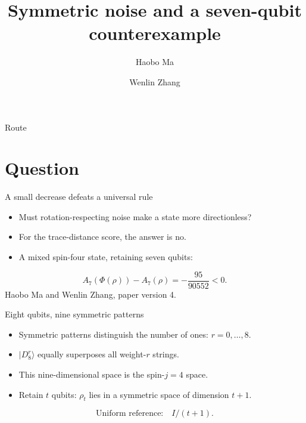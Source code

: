 \documentclass{beamer}
\title{Symmetric noise and a seven-qubit counterexample}
\author{Haobo Ma \and Wenlin Zhang}
\begin{document}
\begin{frame}
\titlepage
{}
\end{frame}
\begin{frame}{Route}
\tableofcontents
{}
\end{frame}
\section{Question}
\begin{frame}{A small decrease defeats a universal rule}
\begin{itemize}
\item Must rotation-respecting noise make a state more directionless?
\item For the trace-distance score, the answer is no.
\item A mixed spin-four state, retaining seven qubits:
\end{itemize}
\[A_7(\Phi(\rho))-A_7(\rho)=-\frac{95}{90552}<0.\]
\small Haobo Ma and Wenlin Zhang, paper version 4.
\end{frame}
\begin{frame}{Eight qubits, nine symmetric patterns}
\begin{itemize}
\item Symmetric patterns distinguish the number of ones: $r=0,\ldots,8$.
\item $|D_8^r\rangle$ equally superposes all weight-$r$ strings.
\item This nine-dimensional space is the spin-$j=4$ space.
\item Retain $t$ qubits: $\rho_t$ lies in a symmetric space of dimension $t+1$.
\end{itemize}
\[\text{Uniform reference:}\quad I/(t+1).\]
\end{frame}
\end{document}
